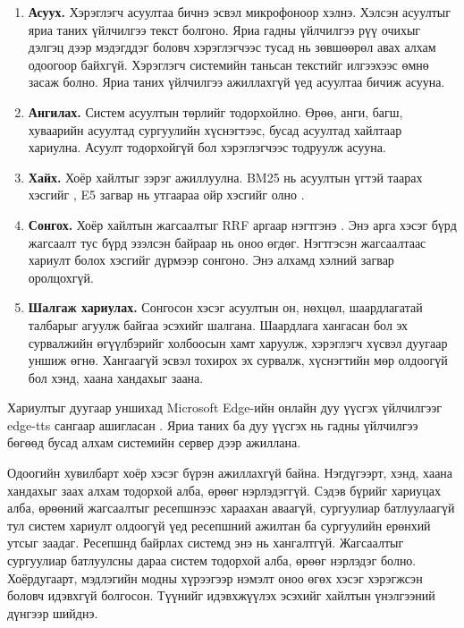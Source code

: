 \begin{enumerate}
    \item \textbf{Асуух.} Хэрэглэгч асуултаа бичнэ эсвэл микрофоноор хэлнэ. Хэлсэн асуултыг яриа таних үйлчилгээ текст болгоно. Яриа гадны үйлчилгээ рүү очихыг дэлгэц дээр мэдэгддэг боловч хэрэглэгчээс тусад нь зөвшөөрөл авах алхам одоогоор байхгүй. Хэрэглэгч системийн таньсан текстийг илгээхээс өмнө засаж болно. Яриа таних үйлчилгээ ажиллахгүй үед асуултаа бичиж асууна.
    \item \textbf{Ангилах.} Систем асуултын төрлийг тодорхойлно. Өрөө, анги, багш, хуваарийн асуултад сургуулийн хүснэгтээс, бусад асуултад хайлтаар хариулна. Асуулт тодорхойгүй бол хэрэглэгчээс тодруулж асууна.
    \item \textbf{Хайх.} Хоёр хайлтыг зэрэг ажиллуулна. BM25 нь асуултын үгтэй таарах хэсгийг \cite{robertson2009bm25}, E5 загвар нь утгаараа ойр хэсгийг олно \cite{wang2024me5}.
    \item \textbf{Сонгох.} Хоёр хайлтын жагсаалтыг \ac{RRF} аргаар нэгтгэнэ \cite{cormack2009rrf}. Энэ арга хэсэг бүрд жагсаалт тус бүрд эзэлсэн байраар нь оноо өгдөг. Нэгтгэсэн жагсаалтаас хариулт болох хэсгийг дүрмээр сонгоно. Энэ алхамд хэлний загвар оролцохгүй.
    \item \textbf{Шалгаж хариулах.} Сонгосон хэсэг асуултын он, нөхцөл, шаардлагатай талбарыг агуулж байгаа эсэхийг шалгана. Шаардлага хангасан бол эх сурвалжийн өгүүлбэрийг холбоосын хамт харуулж, хэрэглэгч хүсвэл дуугаар уншиж өгнө. Хангаагүй эсвэл тохирох эх сурвалж, хүснэгтийн мөр олдоогүй бол хэнд, хаана хандахыг заана.
\end{enumerate}

Хариултыг дуугаар уншихад Microsoft Edge-ийн онлайн дуу үүсгэх үйлчилгээг edge-tts сангаар ашигласан \cite{edge_tts}. Яриа таних ба дуу үүсгэх нь гадны үйлчилгээ бөгөөд бусад алхам системийн сервер дээр ажиллана.

Одоогийн хувилбарт хоёр хэсэг бүрэн ажиллахгүй байна. Нэгдүгээрт, хэнд, хаана хандахыг заах алхам тодорхой алба, өрөөг нэрлэдэггүй. Сэдэв бүрийг хариуцах алба, өрөөний жагсаалтыг ресепшнээс хараахан аваагүй, сургуулиар батлуулаагүй тул систем хариулт олдоогүй үед ресепшний ажилтан ба сургуулийн ерөнхий утсыг заадаг. Ресепшнд байрлах системд энэ нь хангалтгүй. Жагсаалтыг сургуулиар батлуулсны дараа систем тодорхой алба, өрөөг нэрлэдэг болно. Хоёрдугаарт, мэдлэгийн модны хүрээгээр нэмэлт оноо өгөх хэсэг хэрэгжсэн боловч идэвхгүй болгосон. Түүнийг идэвхжүүлэх эсэхийг хайлтын үнэлгээний дүнгээр шийднэ.

